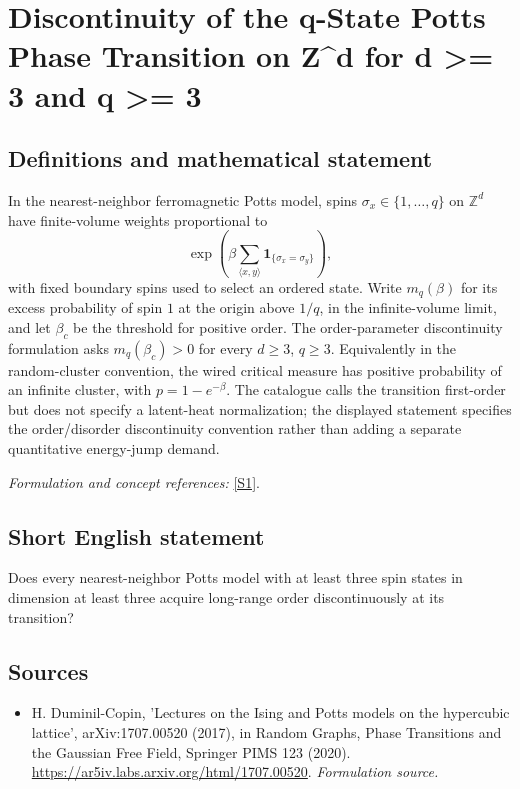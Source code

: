 \documentclass[11pt]{article}
\begin{document}
\section*{\texorpdfstring{Discontinuity of the q-State Potts Phase Transition on Z\textasciicircum{}d for d >= 3 and q >= 3}{Discontinuity of the q-State Potts Phase Transition on Z\textasciicircum{}d for d >= 3 and q >= 3}}\label{30006867}
\subsection{Definitions and mathematical statement}
In the nearest-neighbor ferromagnetic Potts model, spins $\sigma_x\in\{1,\ldots,q\}$ on ${\mathbb{Z}}^d$ have finite-volume weights proportional to
\[
 \exp\!\left(\beta\sum_{\langle x,y\rangle}
 \mathbf1_{\{\sigma_x=\sigma_y\}}\right),
\]
with fixed boundary spins used to select an ordered state. Write $m_q(\beta)$ for its excess probability of spin $1$ at the origin above $1/q$, in the infinite-volume limit, and let $\beta_c$ be the threshold for positive order. The order-parameter discontinuity formulation asks $m_q(\beta_c)>0$ for every $d\ge3$, $q\ge3$. Equivalently in the random-cluster convention, the wired critical measure has positive probability of an infinite cluster, with $p=1-e^{-\beta}$. The catalogue calls the transition first-order but does not specify a latent-heat normalization; the displayed statement specifies the order/disorder discontinuity convention rather than adding a separate quantitative energy-jump demand.
\par\smallskip\textit{Formulation and concept references:} \href{https://ar5iv.labs.arxiv.org/html/1707.00520}{[S1]}.

\subsection{Short English statement}
Does every nearest-neighbor Potts model with at least three spin states in dimension at least three acquire long-range order discontinuously at its transition?
\subsection{Sources}
\begin{itemize}
\item[S1]H. Duminil-Copin, 'Lectures on the Ising and Potts models on the hypercubic lattice', arXiv:1707.00520 (2017), in Random Graphs, Phase Transitions and the Gaussian Free Field, Springer PIMS 123 (2020).
\url{https://ar5iv.labs.arxiv.org/html/1707.00520}.
\textit{Formulation source.}
\end{itemize}
\end{document}

